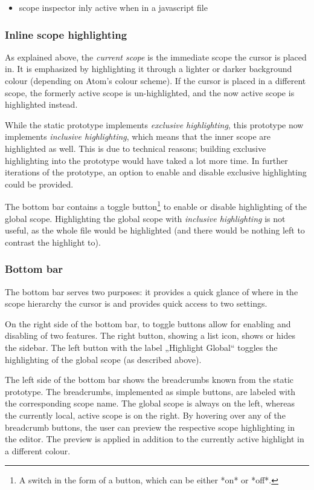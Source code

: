 \begin{itemize}
\itemsep1pt\parskip0pt
\item
  scope inspector inly active when in a javascript file
\end{itemize}

\subsubsection{Inline scope
highlighting}\label{inline-scope-highlighting}

As explained above, the \emph{current scope} is the immediate scope the
cursor is placed in. It is emphasized by highlighting it through a
lighter or darker background colour (depending on Atom’s colour scheme).
If the cursor is placed in a different scope, the formerly active scope
is un-highlighted, and the now active scope is highlighted instead.

While the static prototype implements \emph{exclusive highlighting},
this prototype now implements \emph{inclusive highlighting}, which means
that the inner scope are highlighted as well. This is due to technical
reasons; building exclusive highlighting into the prototype would have
taked a lot more time. In further iterations of the prototype, an option
to enable and disable exclusive highlighting could be provided.

The bottom bar contains a toggle
button\footnote{A switch in the form of a button, which can be either *on* or *off*.}
to enable or disable highlighting of the global scope. Highlighting the
global scope with \emph{inclusive highlighting} is not useful, as the
whole file would be highlighted (and there would be nothing left to
contrast the highlight to).

\subsubsection{Bottom bar}\label{bottom-bar}

The bottom bar serves two purposes: it provides a quick glance of where
in the scope hierarchy the cursor is and provides quick access to two
settings.

On the right side of the bottom bar, to toggle buttons allow for
enabling and disabling of two features. The right button, showing a list
icon, shows or hides the sidebar. The left button with the label
„Highlight Global“ toggles the highlighting of the global scope (as
described above).

The left side of the bottom bar shows the breadcrumbs known from the
static prototype. The breadcrumbs, implemented as simple buttons, are
labeled with the corresponding scope name. The global scope is always on
the left, whereas the currently local, active scope is on the right. By
hovering over any of the breadcrumb buttons, the user can preview the
respective scope highlighting in the editor. The preview is applied in
addition to the currently active highlight in a different colour.


